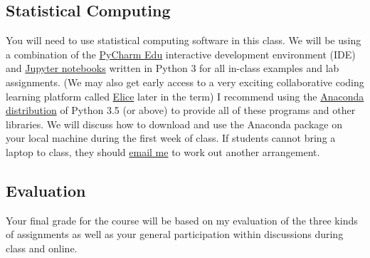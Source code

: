 \documentclass[10pt]{memoir}
\begin{document}
\subsection{Statistical Computing}
You will need to use statistical computing software in this class. We will be using a combination of the  \href{https://www.jetbrains.com/pycharm-edu/download/}{PyCharm Edu} interactive development environment (IDE) and \href{http://jupyter.org/}{Jupyter notebooks} written in Python 3 for all in-class examples and lab assignments. (We may also get early access to a very exciting collaborative coding learning platform called \href{http://www.elice.io}{Elice} later in the term) I recommend using the \href{https://www.continuum.io/why-anaconda}{Anaconda distribution} of Python 3.5 (or above) to provide all of these programs and other libraries. We will discuss how to download and use the Anaconda package on your local machine during the first week of class. If students cannot bring a laptop to class, they should \href{mailto:brian.keegan@colorado.edu}{email me} to work out another arrangement.

\subsection{Evaluation} 
Your final grade for the course will be based on my evaluation of the three kinds of assignments as well as your general participation within discussions during class and online. 
\end{document}
